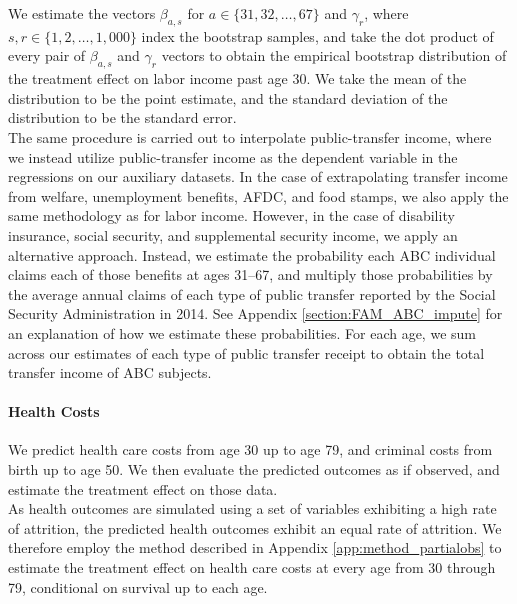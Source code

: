 \noindent We estimate the vectors $\beta_{a, s}$ for $a \in \{31, 32, \dots, 67\}$ and $\gamma_r$, where
$s,r \in \{1,2,\dots,1,000\}$ index the bootstrap samples, and take the dot product of every pair of
$\beta_{a,s}$ and $\gamma_r$ vectors to obtain the empirical bootstrap distribution of the treatment
effect on labor income past age 30. We take the mean of the distribution to be the point estimate,
and the standard deviation of the distribution to be the standard error. \\


\noindent The same procedure is carried out to interpolate public-transfer income, where we instead utilize public-transfer
income as the dependent variable in the regressions on our auxiliary datasets. In the case of
extrapolating transfer income from welfare, unemployment benefits, AFDC, and food stamps, we also apply
the same methodology as for labor income. However, in the case of disability insurance, social
security, and supplemental security income, we apply an alternative approach. Instead, we estimate
the probability each ABC individual claims each of those benefits at ages 31--67, and multiply those
probabilities by the average annual claims of each type of public transfer reported by the Social
Security Administration in 2014. See Appendix \ref{section:FAM_ABC_impute}
for an explanation of how we estimate these probabilities. For each age, we sum across our estimates of
each type of public transfer receipt to obtain the total transfer income of ABC subjects. \\


\paragraph{Health Costs}

\noindent We predict health care costs from age 30 up to age 79, and criminal costs from birth
up to age 50. We then evaluate the predicted outcomes as if observed, and estimate the
treatment effect on those data.\\

\noindent As health outcomes are simulated using a set of variables exhibiting a high rate of attrition, the
predicted health outcomes exhibit an equal rate of attrition. We therefore employ the method described
in Appendix \ref{app:method_partialobs} to estimate the treatment effect on health care costs at
every age from 30 through 79, conditional on survival up to each age. \\

